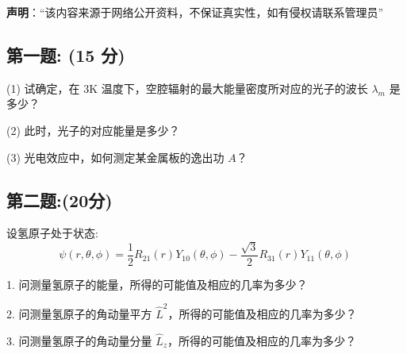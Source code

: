 
\textbf{声明}：“该内容来源于网络公开资料，不保证真实性，如有侵权请联系管理员”

\subsection{第一题: (15 分)}
(1) 试确定，在 3K 温度下，空腔辐射的最大能量密度所对应的光子的波长 $\lambda_m$ 是多少？

(2) 此时，光子的对应能量是多少？

(3) 光电效应中，如何测定某金属板的逸出功 $A$？
\subsection{第二题:(20分)}
设氢原子处于状态:$$\psi(r, \theta, \phi) = \frac{1}{2} R_{21}(r) Y_{10}(\theta, \phi) - \frac{\sqrt{3}}{2} R_{31}(r) Y_{11}(\theta, \phi)~$$

1. 问测量氢原子的能量，所得的可能值及相应的几率为多少？

2. 问测量氢原子的角动量平方 \( \hat{L}^2 \)，所得的可能值及相应的几率为多少？

3. 问测量氢原子的角动量分量 \( \hat{L}_z \)，所得的可能值及相应的几率为多少？